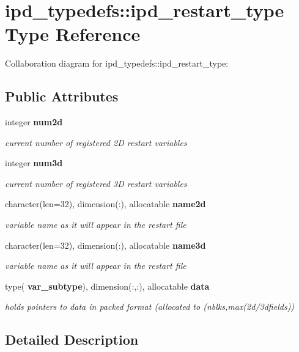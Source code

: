 \section{ipd\+\_\+typedefs\+:\+:ipd\+\_\+restart\+\_\+type Type Reference}
\label{structipd__typedefs_1_1ipd__restart__type}


Collaboration diagram for ipd\+\_\+typedefs\+:\+:ipd\+\_\+restart\+\_\+type\+:
\subsection*{Public Attributes}
\begin{DoxyCompactItemize}
\item 
integer \textbf{ num2d}
\begin{DoxyCompactList}\small\item\em current number of registered 2D restart variables \end{DoxyCompactList}\item 
integer \textbf{ num3d}
\begin{DoxyCompactList}\small\item\em current number of registered 3D restart variables \end{DoxyCompactList}\item 
character(len=32), dimension(\+:), allocatable \textbf{ name2d}
\begin{DoxyCompactList}\small\item\em variable name as it will appear in the restart file \end{DoxyCompactList}\item 
character(len=32), dimension(\+:), allocatable \textbf{ name3d}
\begin{DoxyCompactList}\small\item\em variable name as it will appear in the restart file \end{DoxyCompactList}\item 
type(\textbf{ var\+\_\+subtype}), dimension(\+:,\+:), allocatable \textbf{ data}
\begin{DoxyCompactList}\small\item\em holds pointers to data in packed format (allocated to (nblks,max(2d/3dfields)) \end{DoxyCompactList}\end{DoxyCompactItemize}


\subsection{Detailed Description}


